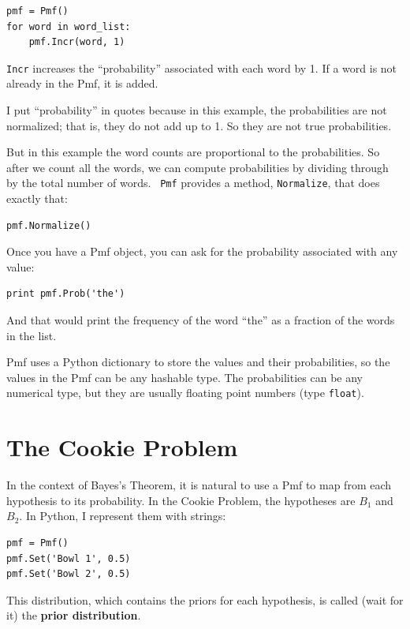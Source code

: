 \documentclass[12pt]{book}
\begin{document}
\begin{verbatim}
pmf = Pmf()
for word in word_list:
    pmf.Incr(word, 1)
\end{verbatim}

\verb"Incr" increases the ``probability'' associated with each
word by 1.  If a word is not already in the Pmf, it is added.

I put ``probability'' in quotes because in this example, the
probabilities are not normalized; that is, they do not add up to 1.
So they are not true probabilities.

But in this example the word counts are proportional to the
probabilities.  So after we count all the words, we can compute
probabilities by dividing through by the total number of words.  {\tt
  Pmf} provides a method, \verb"Normalize", that does exactly that:

\begin{verbatim}
pmf.Normalize()
\end{verbatim}

Once you have a Pmf object, you can ask for the probability
associated with any value:

\begin{verbatim}
print pmf.Prob('the')
\end{verbatim}

And that would print the frequency of the word ``the'' as a fraction
of the words in the list.

Pmf uses a Python dictionary to store the values and their
probabilities, so the values in the Pmf can be any hashable type.
The probabilities can be any numerical type, but they are usually
floating point numbers (type \verb"float").


\section{The Cookie Problem}

In the context of Bayes's Theorem, it is natural to use a Pmf
to map from each hypothesis to its probability.  In the Cookie
Problem, the hypotheses are $B_1$ and $B_2$.  In Python, I
represent them with strings:

\begin{verbatim}
pmf = Pmf()
pmf.Set('Bowl 1', 0.5)
pmf.Set('Bowl 2', 0.5)
\end{verbatim}

This distribution, which contains the priors for each hypothesis,
is called (wait for it) the {\bf prior distribution}.
\end{document}
